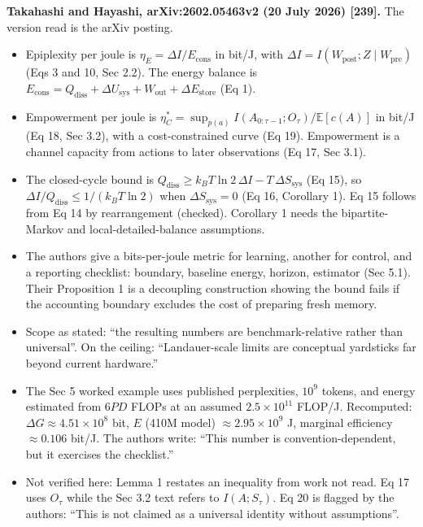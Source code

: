 \documentclass[
  10pt,
]{article}
\providecommand{\tightlist}{%
  \setlength{\itemsep}{0pt}\setlength{\parskip}{0pt}}
\begin{document}
\textbf{Takahashi and Hayashi, arXiv:2602.05463v2 (20 July 2026)
{[}239{]}.} The version read is the arXiv posting.

\begin{itemize}
\tightlist
\item
  Epiplexity per joule is \(\eta_E = \Delta I / E_{\mathrm{cons}}\) in
  bit/J, with
  \(\Delta I = I(W_{\mathrm{post}}; Z \mid W_{\mathrm{pre}})\) (Eqs 3
  and 10, Sec 2.2). The energy balance is
  \(E_{\mathrm{cons}} = Q_{\mathrm{diss}} + \Delta U_{\mathrm{sys}} + W_{\mathrm{out}} + \Delta E_{\mathrm{store}}\)
  (Eq 1).
\item
  Empowerment per joule is
  \(\eta_C^* = \sup_{p(a)} I(A_{0:\tau-1}; O_\tau) / \mathbb{E}[c(A)]\)
  in bit/J (Eq 18, Sec 3.2), with a cost-constrained curve (Eq 19).
  Empowerment is a channel capacity from actions to later observations
  (Eq 17, Sec 3.1).
\item
  The closed-cycle bound is
  \(Q_{\mathrm{diss}} \ge k_B T\ln 2\,\Delta I - T\,\Delta S_{\mathrm{sys}}\)
  (Eq 15), so \(\Delta I / Q_{\mathrm{diss}} \le 1/(k_B T\ln 2)\) when
  \(\Delta S_{\mathrm{sys}} = 0\) (Eq 16, Corollary 1). Eq 15 follows
  from Eq 14 by rearrangement (checked). Corollary 1 needs the
  bipartite-Markov and local-detailed-balance assumptions.
\item
  The authors give a bits-per-joule metric for learning, another for
  control, and a reporting checklist: boundary, baseline energy,
  horizon, estimator (Sec 5.1). Their Proposition 1 is a decoupling
  construction showing the bound fails if the accounting boundary
  excludes the cost of preparing fresh memory.
\item
  Scope as stated: ``the resulting numbers are benchmark-relative rather
  than universal''. On the ceiling: ``Landauer-scale limits are
  conceptual yardsticks far beyond current hardware.''
\item
  The Sec 5 worked example uses published perplexities, \(10^9\) tokens,
  and energy estimated from \(6PD\) FLOPs at an assumed
  \(2.5\times10^{11}\) FLOP/J. Recomputed:
  \(\Delta G \approx 4.51\times10^{8}\) bit, \(E\) (410M model)
  \(\approx 2.95\times10^{9}\) J, marginal efficiency \(\approx 0.106\)
  bit/J. The authors write: ``This number is convention-dependent, but
  it exercises the checklist.''
\item
  Not verified here: Lemma 1 restates an inequality from work not read.
  Eq 17 uses \(O_\tau\) while the Sec 3.2 text refers to
  \(I(A;S_\tau)\). Eq 20 is flagged by the authors: ``This is not
  claimed as a universal identity without assumptions''.
\end{itemize}
\end{document}
